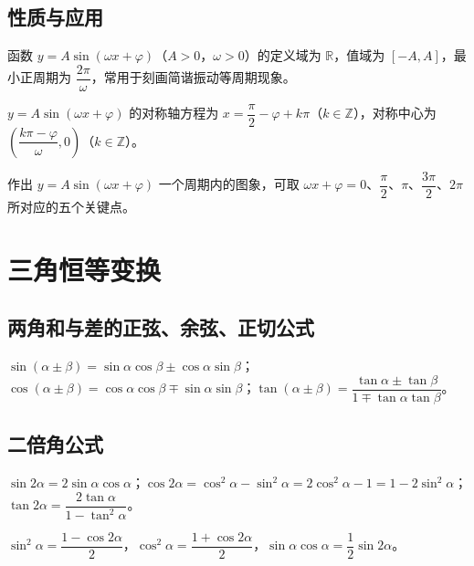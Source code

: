 \subsection{性质与应用}
\begin{definition}[$y=A\sin(\omega x+\varphi)$ 的性质]
函数 $y=A\sin(\omega x+\varphi)$（$A>0$，$\omega>0$）的定义域为 $\mathbb{R}$，值域为 $[-A,A]$，最小正周期为 $\dfrac{2\pi}{\omega}$，常用于刻画简谐振动等周期现象。
\end{definition}
\begin{theorem}[图象的对称性]
$y=A\sin(\omega x+\varphi)$ 的对称轴方程为 $x=\dfrac{\pi}{2}-\varphi+k\pi$（$k \in \mathbb{Z}$），对称中心为 $\left(\dfrac{k\pi-\varphi}{\omega},0\right)$（$k \in \mathbb{Z}$）。
\end{theorem}
\begin{corollary}[五点法]
作出 $y=A\sin(\omega x+\varphi)$ 一个周期内的图象，可取 $\omega x+\varphi=0$、$\dfrac{\pi}{2}$、$\pi$、$\dfrac{3\pi}{2}$、$2\pi$ 所对应的五个关键点。
\end{corollary}

\section{三角恒等变换}
\subsection{两角和与差的正弦、余弦、正切公式}
\begin{definition}[两角和与差公式]
$\sin(\alpha \pm \beta)=\sin\alpha\cos\beta \pm \cos\alpha\sin\beta$；$\cos(\alpha \pm \beta)=\cos\alpha\cos\beta \mp \sin\alpha\sin\beta$；$\tan(\alpha \pm \beta)=\dfrac{\tan\alpha \pm \tan\beta}{1 \mp \tan\alpha\tan\beta}$。
\end{definition}
\subsection{二倍角公式}
\begin{definition}[二倍角公式]
$\sin 2\alpha=2\sin\alpha\cos\alpha$；$\cos 2\alpha=\cos^2\alpha-\sin^2\alpha=2\cos^2\alpha-1=1-2\sin^2\alpha$；$\tan 2\alpha=\dfrac{2\tan\alpha}{1-\tan^2\alpha}$。
\end{definition}
\begin{corollary}[降幂与半角公式]
$\sin^2\alpha=\dfrac{1-\cos 2\alpha}{2}$，$\cos^2\alpha=\dfrac{1+\cos 2\alpha}{2}$，$\sin\alpha\cos\alpha=\dfrac{1}{2}\sin 2\alpha$。
\end{corollary}
